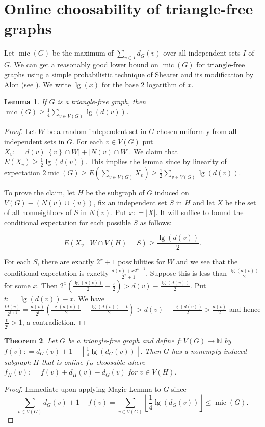 \documentclass[12pt]{article}
\theoremstyle{plain}
\newtheorem{thm}{Theorem}
\newtheorem{lem}[thm]{Lemma}
\theoremstyle{definition}
\theoremstyle{remark}
\newcommand{\IN}{\mathbb{N}}
\newcommand{\set}[1]{\left\{ #1 \right\}}
\newcommand{\card}[1]{\left|#1\right|}
\newcommand{\floor}[1]{\left\lfloor#1\right\rfloor}
\newcommand{\func}[3]{#1\colon #2 \rightarrow #3}
\newcommand{\parens}[1]{\left( #1 \right)}
\newcommand{\DefinedAs}{\mathrel{\mathop:}=}
\newcommand{\mic}{\operatorname{mic}}
\begin{document}
\section{Online choosability of triangle-free graphs}
Let $\mic(G)$ be the maximum of $\sum_{v \in I} d_G(v)$ over all independent sets $I$ of $G$. We can get a reasonably good lower bound on $\mic(G)$ for triangle-free graphs using a simple probabilistic technique of Shearer and its modification by Alon (see \cite{alon2004probabilistic}). We write $\lg(x)$ for the base $2$ logarithm of $x$.  
\begin{lem}\label{triangle-free-mic}
If $G$ is a triangle-free graph, then $\mic(G) \ge \frac14 \sum_{v\in V(G)} \lg(d(v))$.
\end{lem}
\begin{proof}
Let $W$ be a random independent set in $G$ chosen uniformly from all independent sets in $G$.  For each $v \in V(G)$ put $X_v \DefinedAs d(v)\card{\set{v} \cap W} + \card{N(v) \cap W}$.
We claim that $E(X_v) \ge \frac12 \lg(d(v))$.  This implies the lemma since by linearity of expectation $2\mic(G) \ge E\parens{\sum_{v \in V(G)} X_v} \ge \frac12 \sum_{v\in V(G)} \lg(d(v))$.

To prove the claim, let $H$ be the subgraph of $G$ induced on $V(G) - \parens{N(v) \cup \set{v}}$, fix an independent set $S$ in $H$ and let $X$ be the set of all nonneighbors of $S$ in $N(v)$.  Put $x \DefinedAs |X|$.  It will suffice to bound the conditional expectation for each possible $S$ as follows:

\[E\parens{X_v \mid W \cap V(H) = S} \ge \frac{\lg(d(v))}{2}.\]

For each $S$, there are exactly $2^x + 1$ possibilities for $W$ and we see that the conditional expectation is exactly $\frac{d(v) + x2^{x-1}}{2^x + 1}$.  Suppose this is less than $\frac{\lg(d(v))}{2}$ for some $x$.
Then $2^x\parens{\frac{\lg(d(v))}{2} - \frac{x}{2}} > d(v) - \frac{\lg(d(v))}{2}$. Put $t \DefinedAs \lg(d(v)) - x$.  We have $\frac{td(v)}{2^{t+1}} = \frac{d(v)}{2^t}\parens{\frac{\lg(d(v))}{2} - \frac{\lg(d(v)) - t}{2}} > d(v) - \frac{\lg(d(v))}{2} > \frac{d(v)}{2}$ and hence $\frac{t}{2^t} > 1$, a contradiction.
\end{proof}

\begin{thm}\label{triangle-free-chooooser}
	Let $G$ be a triangle-free graph and define $\func{f}{V(G)}{\IN}$ by $f(v) \DefinedAs d_G(v) + 1 - \floor{\frac14 \lg(d_G(v))}$.  Then $G$ has a nonempty induced subgraph $H$ that is online $f_H$-choosable where $f_H(v) \DefinedAs f(v) + d_H(v) - d_G(v)$ for $v \in V(H)$.
\end{thm}
\begin{proof}
	Immediate upon applying Magic Lemma to $G$ since 
	\[\sum_{v \in V(G)} d_G(v) + 1 - f(v) = \sum_{v \in V(G)} \floor{\frac14 \lg(d_G(v))} \le \mic(G).\]
\end{proof}
\end{document}
